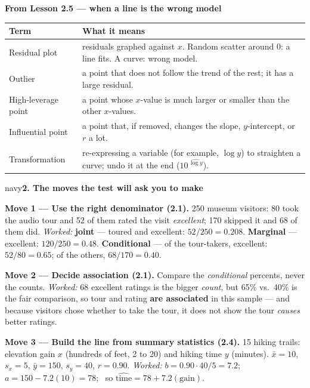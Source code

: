 \documentclass[12pt]{article}
\newcommand{\sghead}[2][10]{%
  \vspace{0.13in}
  \boxguard[#1]
  \begin{headlinebox}{navy}\color{white}\bfseries\small #2\end{headlinebox}
  \vspace{0.09in}}
\begin{document}
\vspace{7pt}
\boxguard[9]
\textbf{From Lesson 2.5 --- when a line is the wrong model}
\par\vspace{3pt}
\noindent\begin{tabularx}{\linewidth}{@{} l X @{}}
\rowcolor{sky}
\textbf{Term} & \textbf{What it means} \\
\midrule
Residual plot & residuals graphed against $x$. Random scatter around 0: a line fits.
                   A curve: wrong model. \\
Outlier & a point that does not follow the trend of the rest; it has a large residual. \\
High-leverage point & a point whose $x$-value is much larger or smaller than the other
                   $x$-values. \\
Influential point & a point that, if removed, changes the slope, $y$-intercept, or $r$ a lot. \\
Transformation & re-expressing a variable (for example, $\log y$) to straighten a curve; undo it
                   at the end ($10^{\,\widehat{\log y}}$). \\
\end{tabularx}

\normalsize

\sghead{2. The moves the test will ask you to make}

\small
\textbf{Move 1 --- Use the right denominator (2.1).} 250 museum visitors: 80 took the audio
tour and 52 of them rated the visit \emph{excellent}; 170 skipped it and 68 of them did.
\emph{Worked:} \textbf{joint} --- toured and excellent: $52/250 = 0.208$. \textbf{Marginal}
--- excellent: $120/250 = 0.48$. \textbf{Conditional} --- of the tour-takers, excellent:
$52/80 = 0.65$; of the others, $68/170 = 0.40$.

\vspace{3pt}
\textbf{Move 2 --- Decide association (2.1).} Compare the \emph{conditional} percents, never
the counts. \emph{Worked:} 68 excellent ratings is the bigger \emph{count}, but 65\% vs.\
40\% is the fair comparison, so tour and rating \textbf{are associated} in this sample --- and
because visitors chose whether to take the tour, it does not show the tour \emph{causes}
better ratings.

\vspace{3pt}
\textbf{Move 3 --- Build the line from summary statistics (2.4).} 15 hiking trails: elevation
gain $x$ (hundreds of feet, 2 to 20) and hiking time $y$ (minutes).
$\bar x = 10$, $s_x = 5$, $\bar y = 150$, $s_y = 40$, $r = 0.90$.
\emph{Worked:} $b = 0.90 \cdot 40/5 = 7.2$; \ $a = 150 - 7.2(10) = 78$; \ so
$\widehat{\text{time}} = 78 + 7.2(\text{gain})$.
\end{document}
